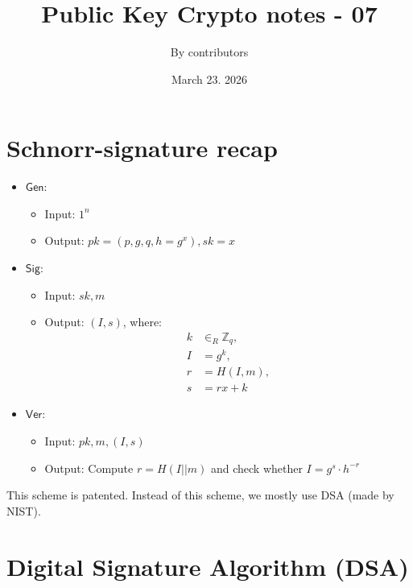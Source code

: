 \documentclass[11pt]{article}
\theoremstyle{definition}
\theoremstyle{proof}
\newcommand{\Gen}{\mathsf{Gen}}
\newcommand{\Sig}{\mathsf{Sig}}
\newcommand{\Ver}{\mathsf{Ver}}
\begin{document}
\title{Public Key Crypto notes - 07}
\author{By contributors}
\date{March 23. 2026}
\maketitle

\section{Schnorr-signature recap}

\begin{itemize}
	\item $\Gen$:
	\begin{itemize}
		\item Input: $1^n$
		\item Output: $pk = (p, g, q, h = g^x), sk = x$
	\end{itemize}
	\item $\Sig$:
	\begin{itemize}
		\item Input: $sk, m$
		\item Output: $(I, s)$, where:
		\begin{align}
			k &\in_R \mathbb{Z}_q, \\
			I &= g^k, \\
			r &= H(I, m), \\
			s &= rx + k
		\end{align}
	\end{itemize}
	\item $\Ver$:
	\begin{itemize}
		\item Input: $pk, m, (I, s)$
		\item Output: Compute $r = H(I || m)$ and check whether $I = g^s \cdot h^{-r}$
	\end{itemize}
\end{itemize}

This scheme is patented. Instead of this scheme, we mostly use DSA (made by NIST).

\section{Digital Signature Algorithm (DSA)}
\end{document}
